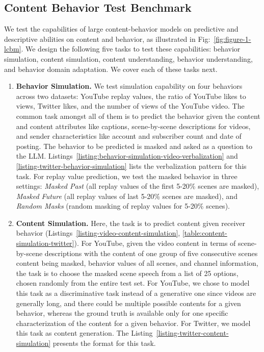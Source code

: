 \subsection{Content Behavior Test Benchmark}
\label{sec:downstream tasks}
\label{sec:test benchmark}
We test the capabilities of large content-behavior models on predictive and descriptive abilities on content and behavior, as illustrated in Fig:~\ref{fig:figure-1-lcbm}. We design the following five tasks to test these capabilities: behavior simulation, content simulation, content understanding, behavior understanding, and behavior domain adaptation.
We cover each of these tasks next.


\begin{enumerate}[leftmargin=*]
    \item\textbf{Behavior Simulation.} We test simulation capability on four behaviors across two datasets: YouTube replay values, the ratio of YouTube likes to views, Twitter likes, and the number of views of the YouTube video. The common task amongst all of them is to predict the behavior given the content and content attributes like captions, scene-by-scene descriptions for videos, and sender characteristics like account and subscriber count and date of posting. The behavior to be predicted is masked and asked as a question to the LLM. Listings~\ref{listing:behavior-simulation-video-verbalization} and \ref{listing-twitter-behavior-simulation} lists the verbalization pattern for this task. For replay value prediction, we test the masked behavior in three settings: \textit{Masked Past} (all replay values of the first 5-20\% scenes are masked), \textit{Masked Future} (all replay values of last 5-20\% scenes are masked), and \textit{Random Masks} (random masking of replay values for 5-20\% scenes).

    

    \item\textbf{Content Simulation.} Here, the task is to predict content given receiver behavior (Listings~\ref{listing-video-content-simulation}, \ref{table:content-simulation-twitter}). For YouTube, given the video content in terms of scene-by-scene descriptions with the content of one group of five consecutive scenes content being masked, behavior values of all scenes, and channel information, the task is to choose the masked scene speech from a list of 25 options, chosen randomly from the entire test set. For YouTube, we chose to model this task as a discriminative task instead of a generative one since videos are generally long, and there could be multiple possible contents for a given behavior, whereas the ground truth is available only for one specific characterization of the content for a given behavior. For Twitter, we model this task as content generation. The Listing~\ref{listing-twitter-content-simulation} presents the format for this task.
    

\end{enumerate}
